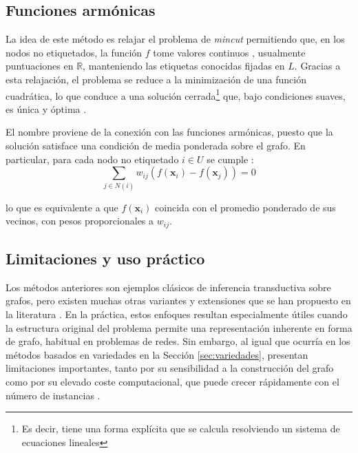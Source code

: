 \subsection{Funciones armónicas}

La idea de este método es relajar el problema de \textit{mincut} permitiendo que, en los nodos no etiquetados, la función $f$ tome valores continuos , usualmente puntuaciones en $\mathbb{R}$, manteniendo las etiquetas conocidas fijadas en $L$. Gracias a esta relajación, el problema se reduce a la minimización de una función cuadrática, lo que conduce a una solución cerrada\footnote{Es decir, tiene una forma explícita que se calcula resolviendo un sistema de ecuaciones lineales} que, bajo condiciones suaves, es única y óptima \cite{zhu2009introduction}.

El nombre proviene de la conexión con las funciones armónicas, puesto que la solución satisface una condición de media ponderada sobre el grafo. En particular, para cada nodo no etiquetado $i\in U$ se cumple \cite{van2020survey}:
\begin{equation}
    \sum_{j \in N(i)} w_{ij} (f(\mathbf{x}_i) - f(\mathbf{x}_j)) = 0
\end{equation}

lo que es equivalente a que $f(\mathbf{x}_i)$ coincida con el promedio ponderado de sus vecinos, con pesos proporcionales a $w_{ij}$.

\subsection{Limitaciones y uso práctico}

Los métodos anteriores son ejemplos clásicos de inferencia transductiva sobre grafos, pero existen muchas otras variantes y extensiones que se han propuesto en la literatura \cite{van2020survey}. En la práctica, estos enfoques resultan especialmente útiles cuando la estructura original del problema permite una representación inherente en forma de grafo, habitual en problemas de redes. Sin embargo, al igual que ocurría en los métodos basados en variedades en la Sección \ref{sec:variedades}, presentan limitaciones importantes, tanto por su sensibilidad a la construcción del grafo como por su elevado coste computacional, que puede crecer rápidamente con el número de instancias \cite{van2020survey}.